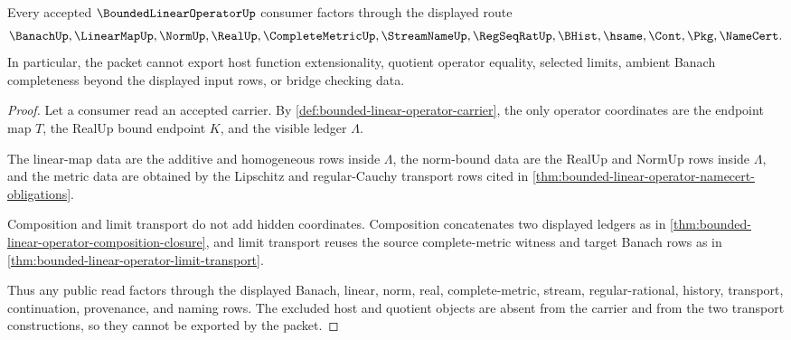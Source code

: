 \begin{theorem}
\label{thm:bounded-linear-operator-nonescape-boundary}
Every accepted $\BoundedLinearOperatorUp$ consumer factors through the displayed route
$$
\BanachUp,\LinearMapUp,\NormUp,\RealUp,\CompleteMetricUp,\StreamNameUp,\RegSeqRatUp,\BHist,\hsame,\Cont,\Pkg,\NameCert .
$$
In particular, the packet cannot export host function extensionality, quotient operator equality, selected limits, ambient Banach completeness beyond the displayed input rows, or bridge checking data.
\end{theorem}
\begin{proof}
Let a consumer read an accepted carrier. By \autoref{def:bounded-linear-operator-carrier}, the only operator coordinates are the endpoint map $T$, the RealUp bound endpoint $K$, and the visible ledger $\Lambda$.

The linear-map data are the additive and homogeneous rows inside $\Lambda$, the norm-bound data are the RealUp and NormUp rows inside $\Lambda$, and the metric data are obtained by the Lipschitz and regular-Cauchy transport rows cited in \autoref{thm:bounded-linear-operator-namecert-obligations}.

Composition and limit transport do not add hidden coordinates. Composition concatenates two displayed ledgers as in \autoref{thm:bounded-linear-operator-composition-closure}, and limit transport reuses the source complete-metric witness and target Banach rows as in \autoref{thm:bounded-linear-operator-limit-transport}.

Thus any public read factors through the displayed Banach, linear, norm, real, complete-metric, stream, regular-rational, history, transport, continuation, provenance, and naming rows. The excluded host and quotient objects are absent from the carrier and from the two transport constructions, so they cannot be exported by the packet.
\end{proof}

